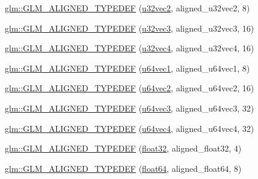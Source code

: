 \begin{DoxyCompactItemize}
\item 
\mbox{\hyperlink{group__gtx__type__aligned_ga1fa0dfc8feb0fa17dab2acd43e05342b}{glm\+::\+G\+L\+M\+\_\+\+A\+L\+I\+G\+N\+E\+D\+\_\+\+T\+Y\+P\+E\+D\+EF}} (\mbox{\hyperlink{group__gtc__type__precision_gad3a81c0d5a6941bb9ffdc9fa8611b426}{u32vec2}}, aligned\+\_\+u32vec2, 8)
\item 
\mbox{\hyperlink{group__gtx__type__aligned_ga0019500abbfa9c66eff61ca75eaaed94}{glm\+::\+G\+L\+M\+\_\+\+A\+L\+I\+G\+N\+E\+D\+\_\+\+T\+Y\+P\+E\+D\+EF}} (\mbox{\hyperlink{group__gtc__type__precision_ga16b26751ba6b83c8a0226b9834d73fdc}{u32vec3}}, aligned\+\_\+u32vec3, 16)
\item 
\mbox{\hyperlink{group__gtx__type__aligned_ga14fd29d01dae7b08a04e9facbcc18824}{glm\+::\+G\+L\+M\+\_\+\+A\+L\+I\+G\+N\+E\+D\+\_\+\+T\+Y\+P\+E\+D\+EF}} (\mbox{\hyperlink{group__gtc__type__precision_ga6e966cda0025699449a36b41f1787927}{u32vec4}}, aligned\+\_\+u32vec4, 16)
\item 
\mbox{\hyperlink{group__gtx__type__aligned_gab253845f534a67136f9619843cade903}{glm\+::\+G\+L\+M\+\_\+\+A\+L\+I\+G\+N\+E\+D\+\_\+\+T\+Y\+P\+E\+D\+EF}} (\mbox{\hyperlink{group__gtc__type__precision_gaf0a59fdb715cf4ddf0c4dabf0e2286a9}{u64vec1}}, aligned\+\_\+u64vec1, 8)
\item 
\mbox{\hyperlink{group__gtx__type__aligned_ga929427a7627940cdf3304f9c050b677d}{glm\+::\+G\+L\+M\+\_\+\+A\+L\+I\+G\+N\+E\+D\+\_\+\+T\+Y\+P\+E\+D\+EF}} (\mbox{\hyperlink{group__gtc__type__precision_gaddd85665767e5d32aee8516f00c45f59}{u64vec2}}, aligned\+\_\+u64vec2, 16)
\item 
\mbox{\hyperlink{group__gtx__type__aligned_gae373b6c04fdf9879f33d63e6949c037e}{glm\+::\+G\+L\+M\+\_\+\+A\+L\+I\+G\+N\+E\+D\+\_\+\+T\+Y\+P\+E\+D\+EF}} (\mbox{\hyperlink{group__gtc__type__precision_ga7f104c29d70170cfb2223b29f7985bd4}{u64vec3}}, aligned\+\_\+u64vec3, 32)
\item 
\mbox{\hyperlink{group__gtx__type__aligned_ga53a8a03dca2015baec4584f45b8e9cdc}{glm\+::\+G\+L\+M\+\_\+\+A\+L\+I\+G\+N\+E\+D\+\_\+\+T\+Y\+P\+E\+D\+EF}} (\mbox{\hyperlink{group__gtc__type__precision_gadafdefd5524bf6a48bb7c47edb787ae5}{u64vec4}}, aligned\+\_\+u64vec4, 32)
\item 
\mbox{\hyperlink{group__gtx__type__aligned_gab3301bae94ef5bf59fbdd9a24e7d2a01}{glm\+::\+G\+L\+M\+\_\+\+A\+L\+I\+G\+N\+E\+D\+\_\+\+T\+Y\+P\+E\+D\+EF}} (\mbox{\hyperlink{group__gtc__type__precision_ga814f2f65354b6588b067cc5c67a6b340}{float32}}, aligned\+\_\+float32, 4)
\item 
\mbox{\hyperlink{group__gtx__type__aligned_ga75930684ff2233171c573e603f216162}{glm\+::\+G\+L\+M\+\_\+\+A\+L\+I\+G\+N\+E\+D\+\_\+\+T\+Y\+P\+E\+D\+EF}} (\mbox{\hyperlink{group__gtc__type__precision_gab721f828b41f46b20cf4883b50733d3b}{float64}}, aligned\+\_\+float64, 8)

\end{DoxyCompactItemize}
